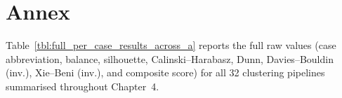 \chapter*{Annex}
\renewcommand{\thetable}{A\arabic{table}}
\renewcommand{\thefigure}{A\arabic{figure}}
\setcounter{table}{0}
\setcounter{figure}{0}

\noindent Table~\ref{tbl:full_per_case_results_across_a} reports the full raw values (case abbreviation, balance, silhouette, Calinski--Harabasz, Dunn, Davies--Bouldin (inv.), Xie--Beni (inv.), and composite score) for all 32 clustering pipelines summarised throughout Chapter~4.

